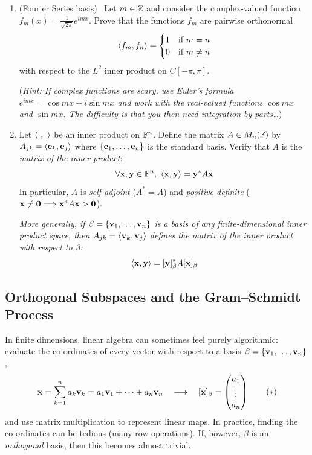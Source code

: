 \begin{exercises}
\begin{enumerate}
	  
	  \item\label{exs:fourier} (Fourier Series basis) \ Let $m\in\mathbb{Z}$ and consider the complex-valued function $f_m(x)=\frac 1{\sqrt{2\pi}}e^{i mx}$. Prove that the functions $f_m$ are pairwise orthonormal 
	  \[
	  	\left\langle f_m,f_n\right\rangle=
	  	\begin{cases}
	  		1&\text{if $m=n$}\\
	  		0&\text{if $m\neq n$}
	  	\end{cases}
	  \]
	  with respect to the $L^2$ inner product on $C[-\pi,\pi]$.\par
	  (\emph{Hint: If complex functions are scary, use Euler's formula $e^{i mx}=\cos mx+i\sin mx$ and work with the real-valued functions $\cos mx$ and $\sin mx$. The difficulty is that you then need integration by parts\ldots})
	  
	  
	  \item\label{exs:allipfn} Let $\left\langle \ ,\ \right\rangle$ be an inner product on $\mathbb{F}^n$. Define the matrix $A\in M_n(\mathbb{F})$ by $A_{jk}=\left\langle {\mathbf{e}}_k,{\mathbf{e}}_j\right\rangle$ where $\{{\mathbf{e}}_1,\ldots,{\mathbf{e}}_{n}\}$ is the standard basis. Verify that $A$ is the \emph{matrix of the inner product}:
	  \[
	  	\forall \vx,\vy\in\F^n,\ \ip{\vx,\vy}=\vy^*A\vx
	  \]
	  In particular, $A$ is \emph{self-adjoint} ($A^*=A$) and \emph{positive-definite} (${\mathbf{x}}\neq\mathbf{0}\Longrightarrow {\mathbf{x}}^*A{\mathbf{x}}>\mathbf{0}$).\par
	  \emph{More generally, if $\beta=\{{\mathbf{v}}_1,\ldots,{\mathbf{v}}_{n}\}$ is a basis of any finite-dimensional inner product space, then $A_{jk}=\left\langle {\mathbf{v}}_k,{\mathbf{v}}_j\right\rangle$ defines the matrix of the inner product with respect to $\beta$:}
	  \[
	  	\left\langle {\mathbf{x}},{\mathbf{y}}\right\rangle=[{\mathbf{y}}]_\beta^*A[{\mathbf{x}}]_\beta
	  \]
	\end{enumerate}
\end{exercises}


\clearpage




\subsection{Orthogonal Subspaces and the Gram--Schmidt Process}\label{sec:gs}


In finite dimensions, linear algebra can sometimes feel purely algorithmic: evaluate the co-ordinates of every vector with respect to a basis $\beta=\{{\mathbf{v}}_1,\ldots,{\mathbf{v}}_{n}\}$,
\[
	{\mathbf{x}}=\sum_{k=1}^na_k{\mathbf{v}}_k={a}_1\mathbf{v}_1+\cdots+{a}_{n}\mathbf{v}_{n} 
	\quad\longrightarrow\quad  
	[{\mathbf{x}}]_\beta=\begin{pmatrix}a_1\\\vdots\\a_n\end{pmatrix} \tag{$\ast$}
\]
and use matrix multiplication to represent linear maps. In practice, finding the co-ordinates can be tedious (many row operations). If, however, $\beta$ is an \emph{orthogonal} basis, then this becomes almost trivial.


